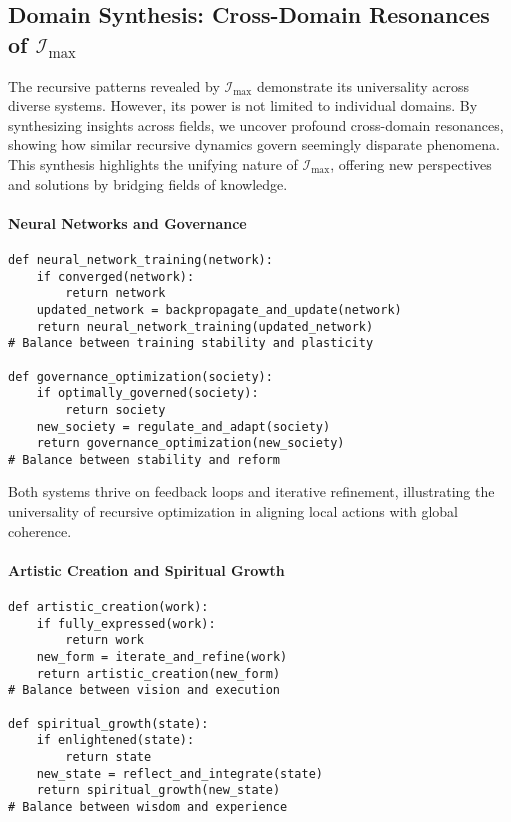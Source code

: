 \documentclass[12pt]{article}
\begin{document}
\subsection{Domain Synthesis: Cross-Domain Resonances of \(\mathcal{I}_{\text{max}}\)}

The recursive patterns revealed by \(\mathcal{I}_{\text{max}}\) demonstrate its universality across diverse systems. However, its power is not limited to individual domains. By synthesizing insights across fields, we uncover profound cross-domain resonances, showing how similar recursive dynamics govern seemingly disparate phenomena. This synthesis highlights the unifying nature of \(\mathcal{I}_{\text{max}}\), offering new perspectives and solutions by bridging fields of knowledge.

\paragraph{Neural Networks and Governance}
\begin{verbatim}
def neural_network_training(network):
    if converged(network):
        return network
    updated_network = backpropagate_and_update(network)
    return neural_network_training(updated_network)
# Balance between training stability and plasticity

def governance_optimization(society):
    if optimally_governed(society):
        return society
    new_society = regulate_and_adapt(society)
    return governance_optimization(new_society)
# Balance between stability and reform
\end{verbatim}

Both systems thrive on feedback loops and iterative refinement, illustrating the universality of recursive optimization in aligning local actions with global coherence.

\paragraph{Artistic Creation and Spiritual Growth}
\begin{verbatim}
def artistic_creation(work):
    if fully_expressed(work):
        return work
    new_form = iterate_and_refine(work)
    return artistic_creation(new_form)
# Balance between vision and execution

def spiritual_growth(state):
    if enlightened(state):
        return state
    new_state = reflect_and_integrate(state)
    return spiritual_growth(new_state)
# Balance between wisdom and experience
\end{verbatim}
\end{document}
